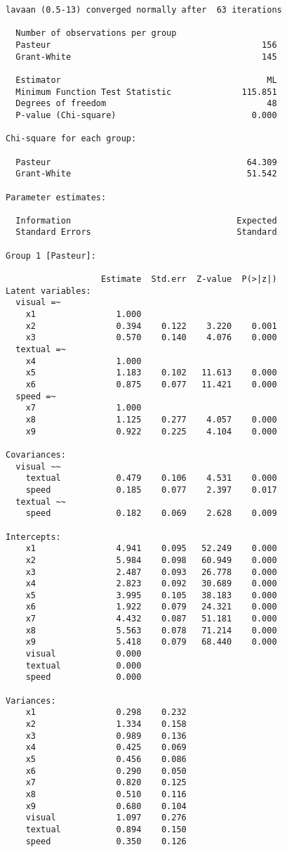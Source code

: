 \begin{verbatim}
lavaan (0.5-13) converged normally after  63 iterations

  Number of observations per group         
  Pasteur                                          156
  Grant-White                                      145

  Estimator                                         ML
  Minimum Function Test Statistic              115.851
  Degrees of freedom                                48
  P-value (Chi-square)                           0.000

Chi-square for each group:

  Pasteur                                       64.309
  Grant-White                                   51.542

Parameter estimates:

  Information                                 Expected
  Standard Errors                             Standard

Group 1 [Pasteur]:

                   Estimate  Std.err  Z-value  P(>|z|)
Latent variables:
  visual =~
    x1                1.000
    x2                0.394    0.122    3.220    0.001
    x3                0.570    0.140    4.076    0.000
  textual =~
    x4                1.000
    x5                1.183    0.102   11.613    0.000
    x6                0.875    0.077   11.421    0.000
  speed =~
    x7                1.000
    x8                1.125    0.277    4.057    0.000
    x9                0.922    0.225    4.104    0.000

Covariances:
  visual ~~
    textual           0.479    0.106    4.531    0.000
    speed             0.185    0.077    2.397    0.017
  textual ~~
    speed             0.182    0.069    2.628    0.009

Intercepts:
    x1                4.941    0.095   52.249    0.000
    x2                5.984    0.098   60.949    0.000
    x3                2.487    0.093   26.778    0.000
    x4                2.823    0.092   30.689    0.000
    x5                3.995    0.105   38.183    0.000
    x6                1.922    0.079   24.321    0.000
    x7                4.432    0.087   51.181    0.000
    x8                5.563    0.078   71.214    0.000
    x9                5.418    0.079   68.440    0.000
    visual            0.000
    textual           0.000
    speed             0.000

Variances:
    x1                0.298    0.232
    x2                1.334    0.158
    x3                0.989    0.136
    x4                0.425    0.069
    x5                0.456    0.086
    x6                0.290    0.050
    x7                0.820    0.125
    x8                0.510    0.116
    x9                0.680    0.104
    visual            1.097    0.276
    textual           0.894    0.150
    speed             0.350    0.126




\end{verbatim}
